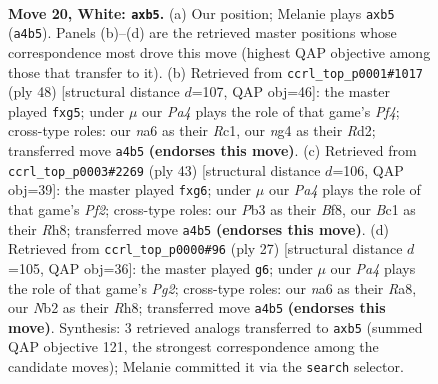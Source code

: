 \documentclass[11pt]{article}
\begin{document}
\clearpage

\begin{figure}[p]\centering
\begin{subfigure}{0.46\textwidth}\centering
\resizebox{\linewidth}{!}{%
\newchessgame
\chessboard[
  setfen={2r1b1k1/p1qr1pp1/n1p1p3/1p5p/Pb1P1Pn1/1PNQ2P1/1N2P2P/R1B1RBK1 w - - 0 20},
  showmover=false,
  pgfstyle=straightmove, color=movearrow, markmove={a4-b5}
]}
\caption{}
\end{subfigure}\hfill
\begin{subfigure}{0.46\textwidth}\centering
\resizebox{\linewidth}{!}{%
\newchessgame
\chessboard[
  setfen={2rqr3/1p2nbbk/p2p3p/3P1pp1/PP2pP1P/1QN3P1/1B1R1PB1/2R3K1 w - - 0 25},
  showmover=false,
  pgfstyle=straightmove, color=movearrow, markmove={f4-g5}
]}
\caption{}
\end{subfigure}
\\[4pt]
\begin{subfigure}{0.46\textwidth}\centering
\resizebox{\linewidth}{!}{%
\newchessgame
\chessboard[
  setfen={3k1b1r/1qrn1pp1/p2p2Pp/4p2N/1pn1P2P/3Q1P2/PPP2B2/2KR1B1R b - - 1 22},
  showmover=false,
  pgfstyle=straightmove, color=movearrow, markmove={f7-g6}
]}
\caption{}
\end{subfigure}\hfill
\begin{subfigure}{0.46\textwidth}\centering
\resizebox{\linewidth}{!}{%
\newchessgame
\chessboard[
  setfen={r3k2r/1pqbbppp/p1npp2P/2n3P1/P3P3/1NN1BP2/1PP5/R2QKB1R b KQkq - 0 14},
  showmover=false,
  pgfstyle=straightmove, color=movearrow, markmove={g7-g6}
]}
\caption{}
\end{subfigure}
\caption{\textbf{Move 20, White: \texttt{axb5}.} (a) Our position; Melanie plays \texttt{axb5} (\texttt{a4b5}). Panels (b)--(d) are the retrieved master positions whose correspondence most drove this move (highest QAP objective among those that transfer to it). (b) Retrieved from \texttt{ccrl\_top\_p0001\#1017} (ply 48) [structural distance $d$=107, QAP obj=46]: the master played \texttt{fxg5}; under $\mu$ our \emph{Pa4} plays the role of that game's \emph{Pf4}; cross-type roles: our \emph{n}a6 as their \emph{R}c1, our \emph{n}g4 as their \emph{R}d2; transferred move \texttt{a4b5} \textbf{(endorses this move)}. (c) Retrieved from \texttt{ccrl\_top\_p0003\#2269} (ply 43) [structural distance $d$=106, QAP obj=39]: the master played \texttt{fxg6}; under $\mu$ our \emph{Pa4} plays the role of that game's \emph{Pf2}; cross-type roles: our \emph{P}b3 as their \emph{B}f8, our \emph{B}c1 as their \emph{R}h8; transferred move \texttt{a4b5} \textbf{(endorses this move)}. (d) Retrieved from \texttt{ccrl\_top\_p0000\#96} (ply 27) [structural distance $d$=105, QAP obj=36]: the master played \texttt{g6}; under $\mu$ our \emph{Pa4} plays the role of that game's \emph{Pg2}; cross-type roles: our \emph{n}a6 as their \emph{R}a8, our \emph{N}b2 as their \emph{R}h8; transferred move \texttt{a4b5} \textbf{(endorses this move)}. Synthesis: 3 retrieved analogs transferred to \texttt{axb5} (summed QAP objective 121, the strongest correspondence among the candidate moves); Melanie committed it via the \texttt{search} selector.}
\label{fig:thought-m38}
\end{figure}
\end{document}
